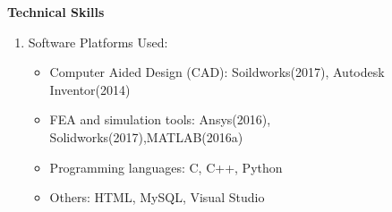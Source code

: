 \documentclass[letterpaper,11pt]{article}
\newcommand{\SmallSep}{\vspace{0.5em}}
\newcommand{\CVSection}[1]
{\Large\textbf{#1}\par
	\SmallSep\normalsize\normalfont}
\begin{document}
\CVSection{Technical Skills}

\begin{enumerate}
	\item Software Platforms Used:\\
	\begin{itemize}
		\item Computer Aided Design (CAD):
		Soildworks(2017), Autodesk Inventor(2014)	
		\item FEA and simulation tools:
		Ansys(2016), Solidworks(2017),MATLAB(2016a)
		\item Programming languages: 
		C, C++, Python
		\item Others: 
		HTML, MySQL, Visual Studio
		
	\end{itemize}
\end{enumerate}
\end{document}
